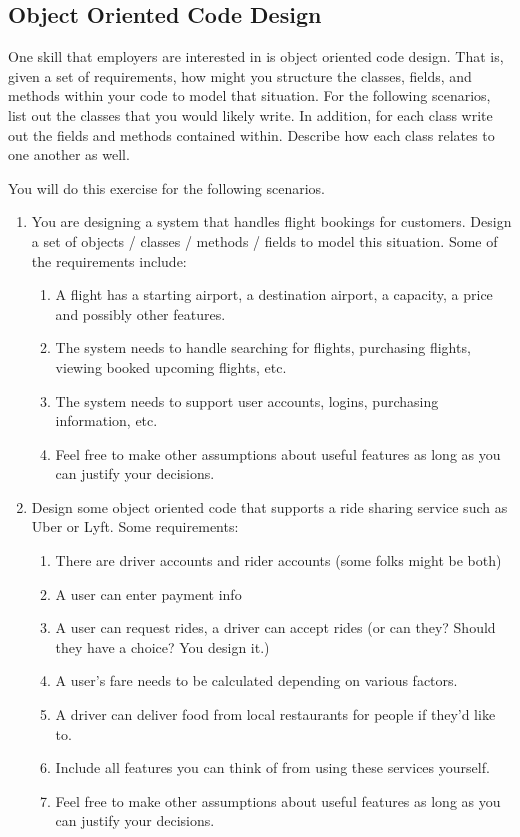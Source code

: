 \documentclass[paper=a4, fontsize=11pt, parskip=full]{scrartcl} %
\numberwithin{equation}{section} %
\numberwithin{figure}{section} %
\numberwithin{table}{section} %
\begin{document}
\subsection{Object Oriented Code Design}

One skill that employers are interested in is object oriented code design. That is, given a set of requirements, how might you structure the classes, fields, and methods within your code to model that situation. For the following scenarios, list out the classes that you would likely write. In addition, for each class write out the fields and methods contained within. Describe how each class relates to one another as well.

You will do this exercise for the following scenarios.

\begin{enumerate}
	\item You are designing a system that handles flight bookings for customers. Design a set of objects / classes / methods / fields to model this situation. Some of the requirements include:
	\begin{enumerate}
		\item A flight has a starting airport, a destination airport, a capacity, a price and possibly other features.
		\item The system needs to handle searching for flights, purchasing flights, viewing booked upcoming flights, etc.
		\item The system needs to support user accounts, logins, purchasing information, etc.
		\item Feel free to make other assumptions about useful features as long as you can justify your decisions.
	\end{enumerate}

	\item Design some object oriented code that supports a ride sharing service such as Uber or Lyft. Some requirements:
	\begin{enumerate}
		\item There are driver accounts and rider accounts (some folks might be both)
		\item A user can enter payment info
		\item A user can request rides, a driver can accept rides (or can they? Should they have a choice? You design it.)
		\item A user's fare needs to be calculated depending on various factors.
		\item A driver can deliver food from local restaurants for people if they'd like to.
		\item Include all features you can think of from using these services yourself.
		\item Feel free to make other assumptions about useful features as long as you can justify your decisions.
	\end{enumerate}


\end{enumerate}
\end{document}
